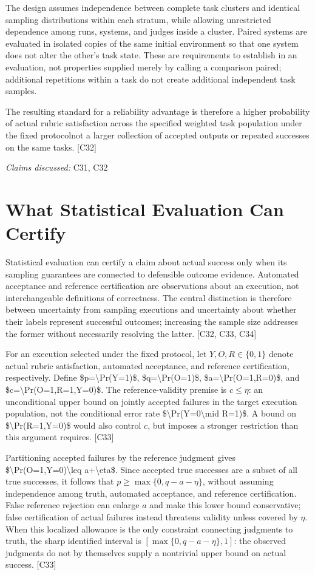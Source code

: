 \documentclass[11pt]{article}
\begin{document}
The design assumes independence between complete task clusters and identical sampling distributions within each stratum, while allowing unrestricted dependence among runs, systems, and judges inside a cluster. Paired systems are evaluated in isolated copies of the same initial environment so that one system does not alter the other\textquoteright{}s task state. These are requirements to establish in an evaluation, not properties supplied merely by calling a comparison paired; additional repetitions within a task do not create additional independent task samples.

The resulting standard for a reliability advantage is therefore a higher probability of actual rubric satisfaction across the specified weighted task population under the fixed protocol\textemdash{}not a larger collection of accepted outputs or repeated successes on the same tasks. [C32]

\textit{Claims discussed: }C31, C32
\section{What Statistical Evaluation Can Certify}
Statistical evaluation can certify a claim about actual success only when its sampling guarantees are connected to defensible outcome evidence. Automated acceptance and reference certification are observations about an execution, not interchangeable definitions of correctness. The central distinction is therefore between uncertainty from sampling executions and uncertainty about whether their labels represent successful outcomes; increasing the sample size addresses the former without necessarily resolving the latter. [C32, C33, C34]

For an execution selected under the fixed protocol, let $Y,O,R\in\{0,1\}$ denote actual rubric satisfaction, automated acceptance, and reference certification, respectively. Define \$p=\textbackslash{}Pr(Y=1)\$, \$q=\textbackslash{}Pr(O=1)\$, \$a=\textbackslash{}Pr(O=1,R=0)\$, and \$c=\textbackslash{}Pr(O=1,R=1,Y=0)\$. The reference-validity premise is $c\leq\eta$: an unconditional upper bound on jointly accepted failures in the target execution population, not the conditional error rate \$\textbackslash{}Pr(Y=0\textbackslash{}mid R=1)\$. A bound on \$\textbackslash{}Pr(R=1,Y=0)\$ would also control $c$, but imposes a stronger restriction than this argument requires. [C33]

Partitioning accepted failures by the reference judgment gives \$\textbackslash{}Pr(O=1,Y=0)\textbackslash{}leq a+\textbackslash{}eta\$. Since accepted true successes are a subset of all true successes, it follows that $p\geq\max\{0,q-a-\eta\}$, without assuming independence among truth, automated acceptance, and reference certification. False reference rejection can enlarge $a$ and make this lower bound conservative; false certification of actual failures instead threatens validity unless covered by $\eta$. When this localized allowance is the only constraint connecting judgments to truth, the sharp identified interval is $[\max\{0,q-a-\eta\},1]$: the observed judgments do not by themselves supply a nontrivial upper bound on actual success. [C33]
\end{document}
